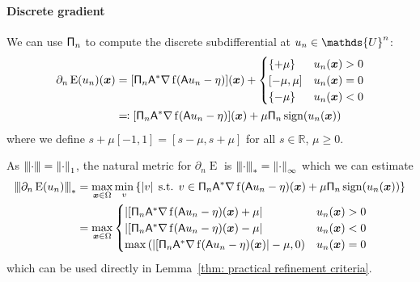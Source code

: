 \documentclass[smallextended]{svjour3}
\let\F\mathds\let\C\mathcal\newcommand{\R}{\F{R}}\newcommand{\A}{\tens{A}}
\newcommand{\norm}[1]{{\left\lVert #1 \right\rVert}}
\newcommand{\Norm}[1]{{\left\vert\kern-0.25ex\left\vert\kern-0.25ex\left\vert #1 \right\vert\kern-0.25ex\right\vert\kern-0.25ex\right\vert}}
\newcommand{\op}[1]{\operatorname{#1}}
\newcommand{\1}{\F{1}}
\DeclareMathOperator{\st}{\;s.t.\;}
\DeclareMathOperator{\sign}{sign}
\newcommand{\data}{\eta}
\newcommand{\Domain}{\Omega}\newcommand{\domain}{\omega}
\newcommand*{\var}[1]{%
	\IfEqCase{#1}{%
		{0}{u}%
		{1}{v}%
		{2}{w}%
	}[u#1]%
}
\begin{document}
	\paragraph{Discrete gradient}
	We can use $\mathsf{\Pi}_n$ to compute the discrete subdifferential at $\var0_n\in\F{U}^n$:
	\begin{align}
		\partial_n \op{E}(\var0_n)(\vec{x}) &= [\tens{\Pi}_n\A^*\nabla\op{f}(\A\var0_n-\data)](\vec{x}) + \begin{cases}
			\{+\mu\} & \var0_n(\vec{x})>0 \\ [-\mu,\mu] & \var0_n(\vec{x})=0 
			\\\{-\mu\} & \var0_n(\vec{x})<0 
		\end{cases} 
		\\&\eqqcolon [\tens{\Pi}_n\A^*\nabla\op{f}(\A\var0_n-\data)](\vec{x}) + \mu\tens{\Pi}_n\sign(\var0_n(\vec{x}))
	\end{align}
	where we define $s+\mu[-1,1] = [s-\mu,s+\mu]$ for all $s\in\R$, $\mu\geq0$. 
	
	As $\Norm\cdot = \norm\cdot_1$, the natural metric for $\partial_n\op{E}$ is $\Norm\cdot_* = \norm\cdot_\infty$ which we can estimate
	\begin{align}
		\Norm{\partial_n \op{E}(\var0_n)}_* &= \max_{\vec{x}\in\Domain}\min_{\var1}\left\{|\var1| \st \var1\in \tens{\Pi}_n\A^*\nabla\op{f}(\A\var0_n-\data)(\vec{x}) +  \mu\tens{\Pi}_n\sign(\var0_n(\vec{x}))\right\}
		\\&= \max_{\vec{x}\in\Domain}\begin{cases}
			|[\tens{\Pi}_n\A^*\nabla\op{f}(\A\var0_n-\data)(\vec{x}) + \mu| & \var0_n(\vec{x})>0
			\\|[\tens{\Pi}_n\A^*\nabla\op{f}(\A\var0_n-\data)(\vec{x}) - \mu| & \var0_n(\vec{x})<0
			\\\max\left(|[\tens{\Pi}_n\A^*\nabla\op{f}(\A\var0_n-\data)(\vec{x})| - \mu, 0\right) & \var0_n(\vec{x}) = 0
		\end{cases}
	\end{align}
	which can be used directly in Lemma~\ref{thm: practical refinement criteria}.
	
\end{document}
